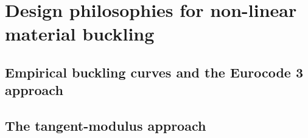
\section{Design philosophies for non-linear material buckling}

\subsection{Empirical buckling curves and the Eurocode 3 approach}
\label{sec:codes-empirical}


\subsection{The tangent-modulus approach}
